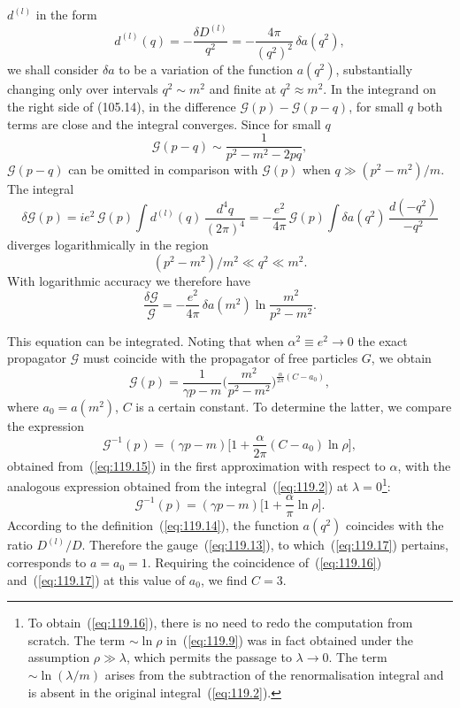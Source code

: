 
\noindent $d^{(l)}$ in the form
\begin{equation}
d^{(l)}(q) = -\frac{\delta D^{(l)}}{q^2} = -\frac{4\pi}{(q^2)^2}\,\delta a(q^2),
\label{eq:119.14}
\end{equation}
we shall consider $\delta a$ to be a variation of the function $a(q^2)$, substantially changing only over intervals $q^2 \sim m^2$ and finite at $q^2 \approx m^2$. In the integrand on the right side of (105.14), in the difference $\mathcal{G}(p) - \mathcal{G}(p-q)$, for small $q$ both terms are close and the integral converges. Since for small $q$
\[
\mathcal{G}(p-q) \sim \frac{1}{p^2 - m^2 - 2pq},
\]
$\mathcal{G}(p-q)$ can be omitted in comparison with $\mathcal{G}(p)$ when $q \gg (p^2 - m^2)/m$. The integral
\[
\delta\mathcal{G}(p) = ie^2\,\mathcal{G}(p) \int d^{(l)}(q)\,\frac{d^4q}{(2\pi)^4} = -\frac{e^2}{4\pi}\,\mathcal{G}(p) \int \delta a(q^2)\,\frac{d(-q^2)}{-q^2}
\]
diverges logarithmically in the region
\[
(p^2 - m^2)/m^2 \ll q^2 \ll m^2.
\]
With logarithmic accuracy we therefore have
\[
\frac{\delta\mathcal{G}}{\mathcal{G}} = -\frac{e^2}{4\pi}\,\delta a(m^2)\ln\frac{m^2}{p^2 - m^2}.
\]

This equation can be integrated. Noting that when $\alpha^2 \equiv e^2 \to 0$ the exact propagator $\mathcal{G}$ must coincide with the propagator of free particles $G$, we obtain
\begin{equation}
\mathcal{G}(p) = \frac{1}{\gamma p - m}\bigg(\frac{m^2}{p^2 - m^2}\bigg)^{\frac{\alpha}{2\pi}(C - a_0)},
\label{eq:119.15}
\end{equation}
where $a_0 = a(m^2)$, $C$ is a certain constant. To determine the latter, we compare the expression
\begin{equation}
\mathcal{G}^{-1}(p) = (\gamma p - m)\bigg[1 + \frac{\alpha}{2\pi}(C - a_0)\ln\rho\bigg],
\label{eq:119.16}
\end{equation}
obtained from~(\ref{eq:119.15}) in the first approximation with respect to $\alpha$, with the analogous expression obtained from the integral~(\ref{eq:119.2}) at $\lambda = 0$\footnote{To obtain~(\ref{eq:119.16}), there is no need to redo the computation from scratch. The term $\sim \ln\rho$ in~(\ref{eq:119.9}) was in fact obtained under the assumption $\rho \gg \lambda$, which permits the passage to $\lambda \to 0$. The term $\sim \ln(\lambda/m)$ arises from the subtraction of the renormalisation integral and is absent in the original integral~(\ref{eq:119.2}).}:
\begin{equation}
\mathcal{G}^{-1}(p) = (\gamma p - m)\bigg[1 + \frac{\alpha}{\pi}\ln\rho\bigg].
\label{eq:119.17}
\end{equation}
According to the definition~(\ref{eq:119.14}), the function $a(q^2)$ coincides with the ratio $D^{(l)}/D$. Therefore the gauge~(\ref{eq:119.13}), to which~(\ref{eq:119.17}) pertains, corresponds to $a = a_0 = 1$. Requiring the coincidence of~(\ref{eq:119.16}) and~(\ref{eq:119.17}) at this value of $a_0$, we find $C = 3$.

